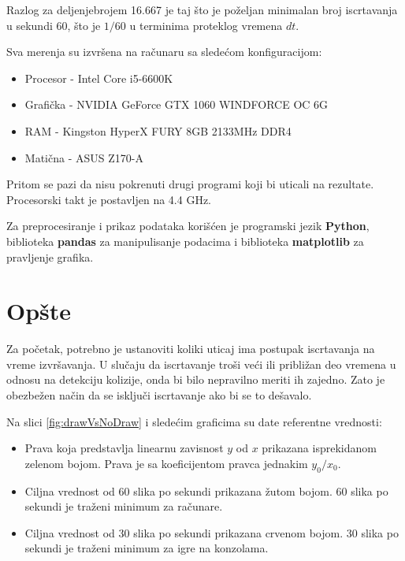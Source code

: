 \documentclass[12pt,oneside]{memoir}
\begin{document}
Razlog za deljenjebrojem 16.667 je taj što je poželjan minimalan broj iscrtavanja u sekundi 60, 
što je $1/60$ u terminima proteklog vremena $dt$.

Sva merenja su izvršena na računaru sa sledećom konfiguracijom:
\begin{itemize}  
	\item Procesor - Intel Core i5-6600K 
	\item Grafička - NVIDIA GeForce GTX 1060 WINDFORCE OC 6G
	\item RAM - Kingston HyperX FURY 8GB 2133MHz DDR4 
	\item Matična - ASUS Z170-A
\end{itemize}  
Pritom se pazi da nisu pokrenuti drugi programi koji bi uticali na rezultate.
Procesorski takt je postavljen na 4.4 GHz.

Za preprocesiranje i prikaz podataka korišćen je programski jezik \textbf{Python},
biblioteka \textbf{pandas} za manipulisanje podacima i biblioteka \textbf{matplotlib}
za pravljenje grafika.

\section{Opšte}

Za početak, potrebno je ustanoviti koliki uticaj ima postupak iscrtavanja na vreme izvršavanja.
U slučaju da iscrtavanje troši veći ili približan deo vremena u odnosu na detekciju kolizije, onda 
bi bilo nepravilno meriti ih zajedno. Zato je obezbežen način da se isključi iscrtavanje ako bi se to dešavalo.


Na slici \ref{fig:drawVsNoDraw} i sledećim graficima su date referentne vrednosti:
\begin{itemize}  
	\item Prava koja predstavlja linearnu zavisnost $y$ od $x$ prikazana isprekidanom zelenom bojom.
	Prava je sa koeficijentom pravca jednakim $y_0/x_0$.
	\item Ciljna vrednost od 60 slika po sekundi prikazana žutom bojom.
	60 slika po sekundi je traženi minimum za računare.
	\item Ciljna vrednost od 30 slika po sekundi prikazana crvenom bojom.
	30 slika po sekundi je traženi minimum za igre na konzolama.
\end{itemize}  
\end{document}
